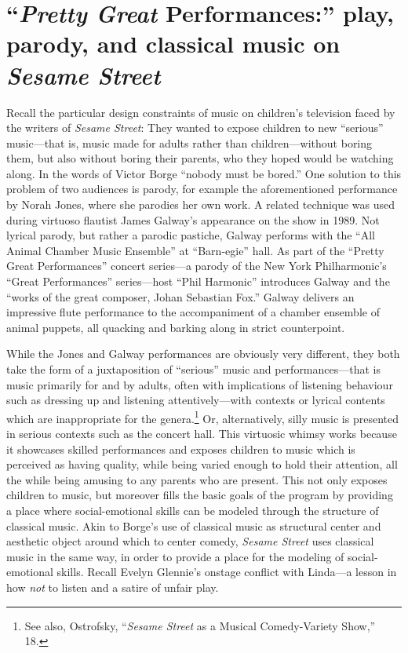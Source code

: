 \documentclass[12pt,letterpaper]{article}
\newcommand{\ses}{\textit{Sesame Street }}
\begin{document}
	\section*{``\textit{Pretty Great} Performances:'' play, parody, and 
	classical music on \ses}
	
	Recall the particular design constraints of music on children's
	television faced by the writers of \textit{Sesame Street}: 	
	They wanted to expose children to new ``serious'' music---that is, music
	made for adults rather than children---without boring
	them, but also without boring their parents, who they hoped would be 
	watching along. In the words of Victor Borge ``nobody must
	be bored.'' One solution to this problem of two audiences is parody,
	for example the aforementioned performance by Norah Jones, where she
	parodies her own work. A related technique was used during virtuoso 
	flautist James Galway's appearance on the show in 1989. Not lyrical 
	parody, but rather a parodic pastiche, Galway performs with the ``All 
	Animal Chamber Music Ensemble'' at ``Barn-egie'' hall. As part of the 
	``Pretty Great Performances'' concert series---a parody of the New York
	Philharmonic's ``Great Performances'' series---host ``Phil Harmonic'' 
	introduces Galway and the ``works of the great composer, Johan Sebastian
	Fox.'' Galway delivers an impressive flute 
	performance to the accompaniment of a chamber ensemble of animal 
	puppets, all quacking and barking along in strict 
	counterpoint.\autocite{Galway2}

        While the Jones and Galway performances are obviously very different, 
	they both take the form of a juxtaposition of ``serious'' music and 
	performances---that is music primarily for and by adults, often with
	implications of listening behaviour such as dressing up and listening 
	attentively---with contexts or lyrical contents which are inappropriate 
	for the genera.\footnote{See also, Ostrofsky,  ``\textit{Sesame Street}
	as a Musical Comedy-Variety Show,'' 18.} Or, alternatively, silly music
	is presented in serious contexts such as the concert hall. This 
	virtuosic whimsy 
	works because it showcases skilled performances and exposes children to
	music which is perceived as having quality, while being varied enough 
	to hold their attention, all the while being amusing to any parents who 
	are present. This not only exposes children to music, but moreover fills
	the basic goals of the program by providing a place where 
	social-emotional skills can be modeled through the structure of
	classical music. Akin to Borge's use of classical music as structural
	center and aesthetic object around which to center comedy, \ses 
	uses classical music in the same way, in order to provide a place for
	the modeling of social-emotional skills. Recall Evelyn Glennie's 
	onstage conflict with Linda---a lesson in how \textit{not} to listen
	and a satire of unfair play. 
\end{document}
